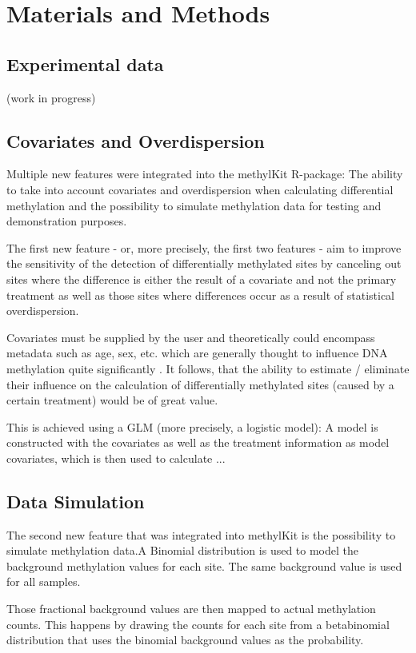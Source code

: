 \section{Materials and Methods}
\subsection{Experimental data}
(work in progress)

\subsection{Covariates and Overdispersion}
Multiple new features were integrated into the methylKit R-package: The ability to take into account covariates and overdispersion when calculating differential methylation and the possibility to simulate methylation data for testing and demonstration purposes.

The first new feature - or, more precisely, the first two features - aim to  improve the sensitivity of the detection of differentially methylated sites by canceling out sites where the difference is either the result of a covariate and not the primary treatment as well as those sites where differences occur as a result of statistical overdispersion.

Covariates must be supplied by the user and theoretically could encompass metadata such as age, sex, etc. which are generally thought to influence DNA methylation quite significantly \cite{24561809}. It follows, that the ability to estimate / eliminate their influence on the calculation of differentially methylated sites (caused by a certain treatment) would be of great value.

This is achieved using a GLM (more precisely, a logistic model): A model is constructed with the covariates as well as the treatment information as model covariates, which is then used to calculate ...\\

\subsection{Data Simulation}
The second new feature that was integrated into methylKit is the possibility to simulate methylation data.A Binomial distribution is used to model the background methylation values for each site. The same background value is used for all samples.

Those fractional background values are then mapped to actual methylation counts. This happens by drawing the counts for each site from a betabinomial distribution that uses the binomial background values as the probability.

